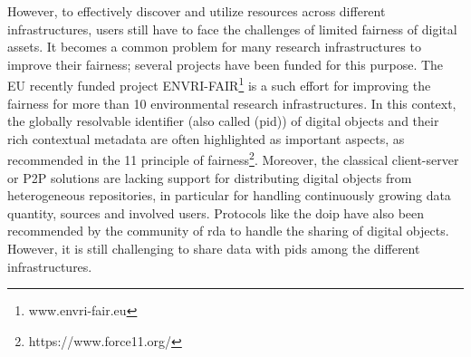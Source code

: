 \documentclass[conference]{IEEEtran}
\begin{document}
However, to effectively discover and utilize resources across different infrastructures, users still have to face the challenges of limited \gls{fairness} of digital assets. It becomes a common problem for many research infrastructures to improve their \gls{fairness}; several projects have been funded for this purpose. The EU recently funded project ENVRI-FAIR\footnote{www.envri-fair.eu} is a such effort for improving the \gls{fairness} for more than 10 environmental research infrastructures. In this context, the globally resolvable identifier (also called (\gls{pid})) of digital objects and their rich contextual metadata are often highlighted as important aspects, as recommended in the 11 principle of \gls{fairness}\footnote{ https://www.force11.org/}.
Moreover, the classical client-server or P2P solutions are lacking support for distributing digital objects from heterogeneous repositories, in particular for handling continuously growing data quantity, sources and involved users. Protocols like the \gls{doip} have also been recommended by the community of \gls{rda} to handle the sharing of digital objects. However, it is still challenging to share data with \glspl{pid} among the different infrastructures.

\end{document}
